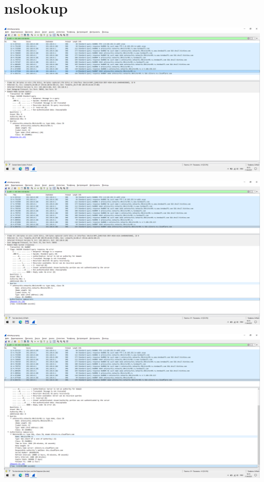 
\section{nslookup}

\includegraphics[width=\textwidth]{screenshots/nslookup_request_1}

\includegraphics[width=\textwidth]{screenshots/nslookup_response_1}

\includegraphics[width=\textwidth]{screenshots/nslookup_response_2}

